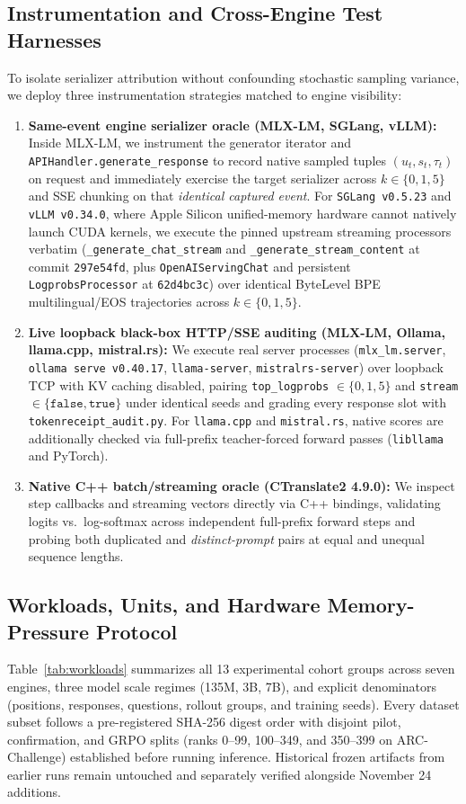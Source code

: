 \documentclass[11pt,letterpaper]{article}
\begin{document}
\subsection{Instrumentation and Cross-Engine Test Harnesses}
To isolate serializer attribution without confounding stochastic sampling variance, we deploy three instrumentation strategies matched to engine visibility:
\begin{enumerate}
\item \textbf{Same-event engine serializer oracle (MLX-LM, SGLang, vLLM):} Inside MLX-LM, we instrument the generator iterator and \texttt{APIHandler.\allowbreak generate\_response} to record native sampled tuples $(u_t, s_t, \tau_t)$ on request and immediately exercise the target serializer across $k \in \{0, 1, 5\}$ and SSE chunking on that \emph{identical captured event}. For \texttt{SGLang v0.5.23} and \texttt{vLLM v0.34.0}, where Apple Silicon unified-memory hardware cannot natively launch CUDA kernels, we execute the pinned upstream streaming processors verbatim (\texttt{\_generate\_\allowbreak chat\_stream} and \texttt{\_generate\_\allowbreak stream\_content} at commit \texttt{297e54fd}, plus \texttt{OpenAI\allowbreak ServingChat} and persistent \texttt{LogprobsProcessor} at \texttt{62d4bc3c}) over identical ByteLevel BPE multilingual/EOS trajectories across $k \in \{0, 1, 5\}$.
\item \textbf{Live loopback black-box HTTP/SSE auditing (MLX-LM, Ollama, llama.cpp, mistral.rs):} We execute real server processes (\texttt{mlx\_lm.server}, \texttt{ollama serve v0.40.17}, \texttt{llama-server}, \texttt{mistralrs-server}) over loopback TCP with KV caching disabled, pairing \texttt{top\_logprobs} $\in \{0, 1, 5\}$ and \texttt{stream} $\in \{\texttt{false}, \texttt{true}\}$ under identical seeds and grading every response slot with \texttt{tokenreceipt\_audit.py}. For \texttt{llama.cpp} and \texttt{mistral.rs}, native scores are additionally checked via full-prefix teacher-forced forward passes (\texttt{libllama} and PyTorch).
\item \textbf{Native C++ batch/streaming oracle (CTranslate2 4.9.0):} We inspect step callbacks and streaming vectors directly via C++ bindings, validating logits vs.\ log-softmax across independent full-prefix forward steps and probing both duplicated and \emph{distinct-prompt} pairs at equal and unequal sequence lengths.
\end{enumerate}

\subsection{Workloads, Units, and Hardware Memory-Pressure Protocol}
Table~\ref{tab:workloads} summarizes all 13 experimental cohort groups across seven engines, three model scale regimes (135M, 3B, 7B), and explicit denominators (positions, responses, questions, rollout groups, and training seeds). Every dataset subset follows a pre-registered SHA-256 digest order with disjoint pilot, confirmation, and GRPO splits (ranks 0--99, 100--349, and 350--399 on ARC-Challenge) established before running inference. Historical frozen artifacts from earlier runs remain untouched and separately verified alongside November 24 additions.
\end{document}
